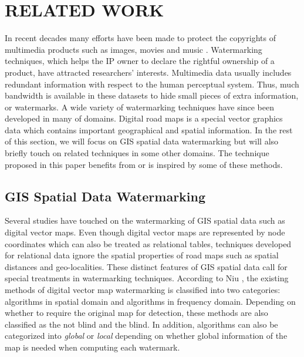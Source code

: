 \section{RELATED WORK}
\label{sec:related}
In recent decades many efforts have been made to protect the copyrights of 
multimedia products such as images, movies and music \cite{BoneyTH96,ChangA01}. 
Watermarking techniques, 
which helps the IP owner to declare the rightful ownership of a product, 
have attracted researchers' interests. 
Multimedia data usually includes redundant information with respect to 
the human perceptual system. Thus, much bandwidth is available in these 
datasets to hide small pieces of extra information, or watermarks. 
A wide variety of watermarking techniques 
have since been developed in many of domains. 
Digital road maps is a special vector graphics data which contains important
geographical and spatial information. In the rest of this section, we will
focus on GIS spatial data watermarking but will also briefly touch on related
techniques in some other domains.
The technique proposed in this paper benefits from or is inspired 
by some of these methods.

\subsection{GIS Spatial Data Watermarking}
Several studies have touched on the watermarking of GIS spatial data such as digital 
vector maps. Even though digital vector maps are represented by node coordinates which 
can also be treated as relational tables, techniques developed for relational data 
ignore the spatial properties of road maps such as spatial distances and geo-localities.
These distinct features of GIS spatial data call for special treatments in watermarking
techniques. According to Niu \cite{Niu06:Survey}, the existing methods of 
digital vector map watermarking is classified into two categories: 
algorithms in spatial domain and algorithms in frequency domain. 
Depending on whether to require the original map 
for detection, these methods are also classified as the not blind and the blind.
In addition, algorithms can also be categorized into {\em global} or {\em local}
depending on whether global information of the map is needed when computing each
watermark.

